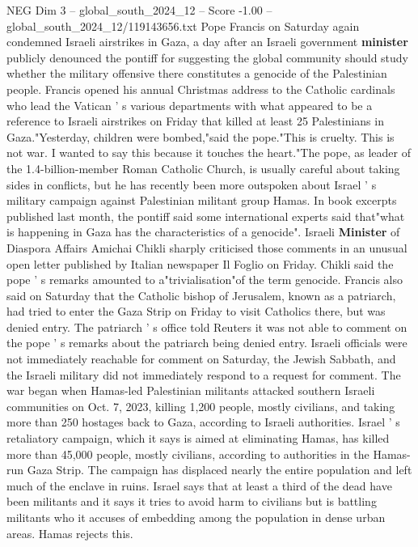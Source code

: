 \begin{textsample}{NEG Dim 3 – global\_south\_2024\_12 – Score -1.00 – global\_south\_2024\_12/119143656.txt}  \label{ex:f3_neg_068}
Pope Francis on Saturday again condemned Israeli airstrikes in Gaza, a day after an Israeli government \textbf{minister} publicly denounced the pontiff for suggesting the global community should study whether the military offensive there constitutes a genocide of the Palestinian people.
Francis opened his annual Christmas address to the Catholic cardinals who lead the Vatican ' s various departments with what appeared to be a reference to Israeli airstrikes on Friday that killed at least 25 Palestinians in Gaza."Yesterday, children were bombed,"said the pope."This is cruelty.
This is not war.
I wanted to say this because it touches the heart."The pope, as leader of the 1.4-billion-member Roman Catholic Church, is usually careful about taking sides in conflicts, but he has recently been more outspoken about Israel ' s military campaign against Palestinian militant group Hamas.
In book excerpts published last month, the pontiff said some international experts said that"what is happening in Gaza has the characteristics of a genocide".
Israeli \textbf{Minister} of Diaspora Affairs Amichai Chikli sharply criticised those comments in an unusual open letter published by Italian newspaper Il Foglio on Friday.
Chikli said the pope ' s remarks amounted to a"trivialisation"of the term genocide.
Francis also said on Saturday that the Catholic bishop of Jerusalem, known as a patriarch, had tried to enter the Gaza Strip on Friday to visit Catholics there, but was denied entry.
The patriarch ' s office told Reuters it was not able to comment on the pope ' s remarks about the patriarch being denied entry.
Israeli officials were not immediately reachable for comment on Saturday, the Jewish Sabbath, and the Israeli military did not immediately respond to a request for comment.
The war began when Hamas-led Palestinian militants attacked southern Israeli communities on Oct. 7, 2023, killing 1,200 people, mostly civilians, and taking more than 250 hostages back to Gaza, according to Israeli authorities.
Israel ' s retaliatory campaign, which it says is aimed at eliminating Hamas, has killed more than 45,000 people, mostly civilians, according to authorities in the Hamas-run Gaza Strip.
The campaign has displaced nearly the entire population and left much of the enclave in ruins.
Israel says that at least a third of the dead have been militants and it says it tries to avoid harm to civilians but is battling militants who it accuses of embedding among the population in dense urban areas.
Hamas rejects this.

\end{textsample}
